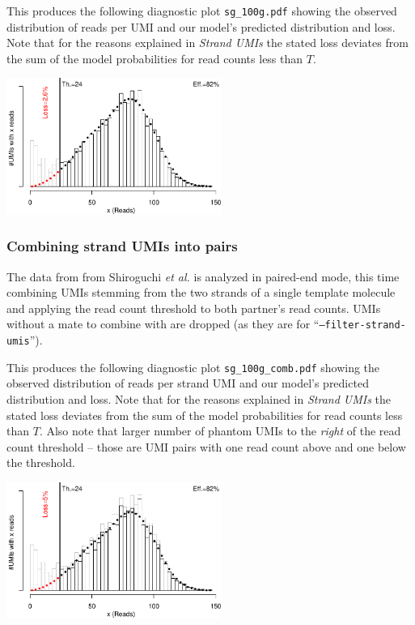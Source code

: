 \documentclass[10pt]{article}
\begin{document}

This produces the following diagnostic plot \texttt{sg\_100g.pdf} showing the observed distribution of reads per UMI and our model's predicted distribution and loss. Note that for the reasons explained in \emph{Strand UMIs} the stated loss deviates from the sum of the model probabilities for read counts less than $T$.

{\centering \includegraphics[width=7cm]{../examples/sg_100g.pdf}\\}

\subsubsection*{Combining strand UMIs into pairs}

The data from from Shiroguchi \textit{et al.} is analyzed in paired-end mode, this time combining UMIs stemming from the two strands of a single template molecule and applying the read count threshold to both partner's read counts. UMIs without a mate to combine with are dropped (as they are for ``\texttt{--filter-strand-umis}'').


This produces the following diagnostic plot \texttt{sg\_100g\_comb.pdf} showing the observed distribution of reads per strand UMI and our model's predicted distribution and loss. Note that for the reasons explained in \emph{Strand UMIs} the stated loss deviates from the sum of the model probabilities for read counts less than $T$. Also note that larger number of phantom UMIs to the \emph{right} of the read count threshold -- those are UMI pairs with one read count above and one below the threshold.

{\centering \includegraphics[width=7cm]{../examples/sg_100g_comb.pdf}\\}
\end{document}
